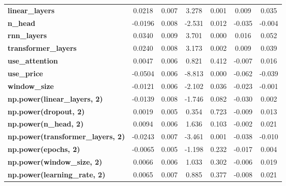 \begin{center}
\begin{tabular}{lcccccc}
\textbf{linear\_layers}                   &       0.0218  &        0.007     &     3.278  &         0.001        &        0.009    &        0.035     \\
\textbf{n\_head}                          &      -0.0196  &        0.008     &    -2.531  &         0.012        &       -0.035    &       -0.004     \\
\textbf{rnn\_layers}                      &       0.0340  &        0.009     &     3.701  &         0.000        &        0.016    &        0.052     \\
\textbf{transformer\_layers}              &       0.0240  &        0.008     &     3.173  &         0.002        &        0.009    &        0.039     \\
\textbf{use\_attention}                   &       0.0047  &        0.006     &     0.821  &         0.412        &       -0.007    &        0.016     \\
\textbf{use\_price}                       &      -0.0504  &        0.006     &    -8.813  &         0.000        &       -0.062    &       -0.039     \\
\textbf{window\_size}                     &      -0.0121  &        0.006     &    -2.102  &         0.036        &       -0.023    &       -0.001     \\
\textbf{np.power(linear\_layers, 2)}      &      -0.0139  &        0.008     &    -1.746  &         0.082        &       -0.030    &        0.002     \\
\textbf{np.power(dropout, 2)}             &       0.0019  &        0.005     &     0.354  &         0.723        &       -0.009    &        0.013     \\
\textbf{np.power(n\_head, 2)}             &       0.0094  &        0.006     &     1.636  &         0.103        &       -0.002    &        0.021     \\
\textbf{np.power(transformer\_layers, 2)} &      -0.0243  &        0.007     &    -3.461  &         0.001        &       -0.038    &       -0.010     \\
\textbf{np.power(epochs, 2)}              &      -0.0065  &        0.005     &    -1.198  &         0.232        &       -0.017    &        0.004     \\
\textbf{np.power(window\_size, 2)}        &       0.0066  &        0.006     &     1.033  &         0.302        &       -0.006    &        0.019     \\
\textbf{np.power(learning\_rate, 2)}      &       0.0065  &        0.007     &     0.885  &         0.377        &       -0.008    &        0.021     \\

\end{tabular}
\end{center}

